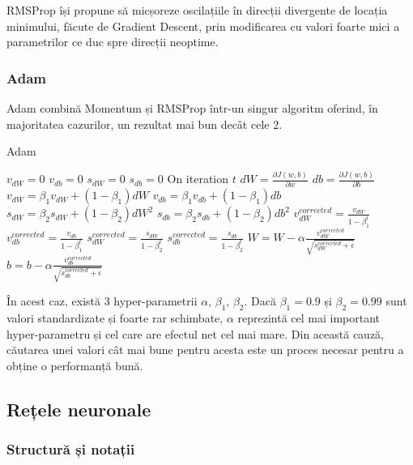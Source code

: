 RMSProp își propune să micșoreze oscilațiile în direcții divergente de locația minimului, făcute de Gradient Descent, prin modificarea cu valori foarte mici a parametrilor ce duc spre direcții neoptime. \cite{rmsprop}

\subsubsection{Adam}

Adam combină Momentum și RMSProp într-un singur algoritm oferind, în majoritatea cazurilor, un rezultat mai bun decât cele 2. \cite{adam}

\begin{algorithm}
\caption{Adam}
\begin{algorithmic}[4]
\State $v_{dW} = 0$
$v_{db} = 0$
$s_{dW} = 0$
$s_{db} = 0$
\State On iteration $t$
\State $dW = \frac{\partial J(w,b)}{\partial w}$
$db = \frac{\partial J(w,b)}{\partial b}$
\State $v_{dW} = \beta_1 v_{dW} + (1-\beta_1)dW$
$v_{db} = \beta_1 v_{db} + (1-\beta_1)db$
\State $s_{dW} = \beta_2 s_{dW} + (1-\beta_2)dW^2$
$s_{db} = \beta_2 s_{db} + (1-\beta_2)db^2$
\State $\displaystyle{v_{dW}^{corrected} = \frac{v_{dW}}{1 - \beta_1^t}}$
$\displaystyle{v_{db}^{corrected} = \frac{v_{db}}{1 - \beta_1^t}}$
\State $\displaystyle{s_{dW}^{corrected} = \frac{s_{dW}}{1 - \beta_2^t}}$
$\displaystyle{s_{db}^{corrected} = \frac{s_{db}}{1 - \beta_2^t}}$
\State $\displaystyle{W = W - \alpha \frac{v_{dW}^{corrected}}{\sqrt{s_{dW}^{corrected} + \epsilon}}}$
$\displaystyle{b = b - \alpha \frac{v_{db}^{corrected}}{\sqrt{s_{db}^{corrected} + \epsilon}}}$
\EndWhile
\end{algorithmic}
\end{algorithm} 

În acest caz, există 3 hyper-parametrii $\alpha, \, \beta_1, \, \beta_2$. Dacă $\beta_1=0.9$ și $\beta_2=0.99$ sunt valori standardizate și foarte rar schimbate, $\alpha$ reprezintă cel mai important hyper-parametru și cel care are efectul net cel mai mare. Din această cauză, căutarea unei valori cât mai bune pentru acesta este un proces necesar pentru a obține o performanță bună.

\subsection{Rețele neuronale}
\subsubsection{Structură și notații}

